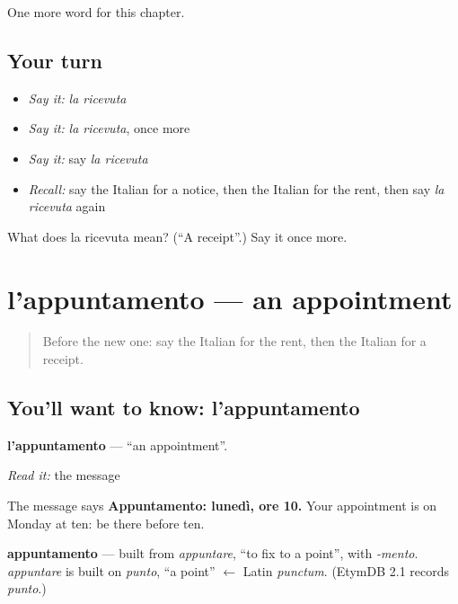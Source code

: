 \begin{grammarlens}[title={What you've built}]
One more word for this chapter.
\end{grammarlens}

\subsection*{Your turn}
\begin{itemize}
\raggedright
  \item \emph{Say it:} \emph{la ricevuta}
  \item \emph{Say it:} \emph{la ricevuta}, once more
  \item \emph{Say it:} say \emph{la ricevuta}
  \item \emph{Recall:} say the Italian for a notice, then the Italian for the rent, then say \emph{la ricevuta} again
\end{itemize}

\begin{tcolorbox}[breakable,colback=teal!4,colframe=teal!35!black,title={Before you move on}]
What does la ricevuta mean? (\textquotedblleft{}A receipt\textquotedblright{}.) Say it once more.
\end{tcolorbox}
\section[l'appuntamento]{l'appuntamento — an appointment}

\label{lesson:IT-C139-lappuntamento}



\begin{quote}
Before the new one: say the Italian for the rent, then the Italian for a receipt.
\end{quote}

\subsection*{You'll want to know: l'appuntamento}
\textbf{l'appuntamento} — \textquotedblleft{}an appointment\textquotedblright{}.

\emph{Read it:} the message

The message says \textbf{Appuntamento: lunedì, ore 10.} Your appointment is on Monday at ten: be there before ten.

\begin{cousinweb}
\textbf{appuntamento} — built from \emph{appuntare}, \textquotedblleft{}to fix to a point\textquotedblright{}, with \emph{-mento}. \emph{appuntare} is built on \emph{punto}, \textquotedblleft{}a point\textquotedblright{} $\leftarrow$ Latin \emph{punctum}. (EtymDB 2.1 records \emph{punto}.)
\end{cousinweb}

